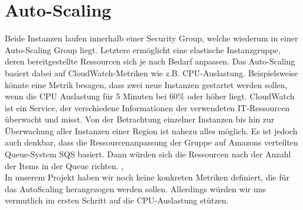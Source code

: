 \section{Auto-Scaling}
\label{sec:auto-scaling}
Beide Instanzen laufen innerhalb einer Security Group, welche wiederum in einer Auto-Scaling Group liegt. Letztere ermöglicht eine elastische Instanzgruppe, deren bereitgestellte Ressourcen sich je nach Bedarf anpassen. Das Auto-Scaling basiert dabei auf CloudWatch-Metriken wie z.B. CPU-Auslastung. Beispielsweise könnte eine Metrik besagen, dass zwei neue Instanzen gestartet werden sollen, wenn die CPU Auslastung für 5 Minuten bei 60\% oder höher liegt. CloudWatch ist ein Service, der verschiedene Informationen der verwendeten IT-Ressourcen überwacht und misst. Von der Betrachtung einzelner Instanzen bis hin zur Überwachung aller Instanzen einer Region ist nahezu alles möglich. Es ist jedoch auch denkbar, dass die Ressourcenanpassung der Gruppe auf Amazons verteilten Queue-System SQS basiert. Dann würden sich die Ressourcen nach der Anzahl der Items in der Queue richten. \cite{vliet:resilience}, \cite{vliet:programmingec2} \\

In unserem Projekt haben wir noch keine konkreten Metriken definiert, die für das AutoScaling herangezogen werden sollen. Allerdings würden wir uns vermutlich im ersten Schritt auf die CPU-Auslastung stützen.

